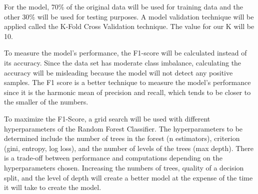\documentclass[conference]{IEEEtran}
\begin{document}
For the model, 70\% of the original data will be used for training data and the other 30\%  will be used for testing purposes. A model validation technique will be applied called the K-Fold Cross Validation technique. The value for our K will be 10.

To measure the model's performance, the F1-score will be calculated instead of its accuracy. Since the data set has moderate class imbalance, calculating the accuracy will be misleading because the model will not detect any positive samples. The F1 score is a better technique to measure the model's performance since it is the harmonic mean of precision and recall, which tends to be closer to the smaller of the numbers.

To maximize the F1-Score, a grid search will be used with different hyperparameters of the Random Forest Classifier. The hyperparameters to be determined include the number of trees in the forest (n estimators), criterion (gini, entropy, log loss), and the number of levels of the trees (max depth). There is a trade-off between performance and computations depending on the hyperparameters chosen. Increasing the numbers of trees, quality of a decision split, and the level of depth will create a better model at the expense of the time it will take to create the model.

\textbf{}









\end{document}
